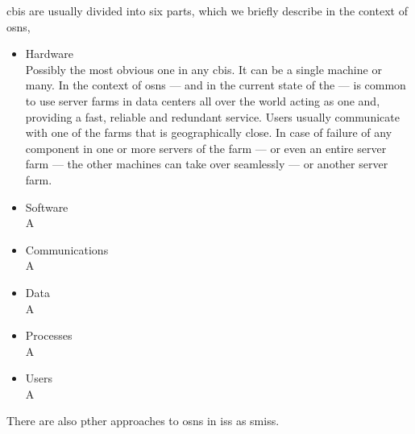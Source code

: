 \documentclass[showtrims,oldfontcommands]{kthesis}
\begin{document}
\Ac{cbis} are usually divided into six parts, which we briefly describe in the context 
of \acp{osn},
\begin{itemize}
    \item Hardware\\
    Possibly the most obvious one in any \ac{cbis}. It can be a single machine or 
    many. In the context of \acp{osn} --- and in the current state of the \Internet 
    --- is common to use server farms in data centers all over the world acting 
    as one and, providing a fast, reliable and redundant service. Users usually 
    communicate with one of the farms that is geographically close. In case of failure 
    of any component in one or more servers of the farm --- or even an entire server 
    farm --- the other machines can take over seamlessly --- or another server farm.
    
    \item Software\\
    A
    
    \item Communications\\
    A
    
    \item Data\\
    A
    
    \item Processes\\
    A
    
    \item Users\\
    A
    
\end{itemize}


There are also pther approaches to \acp{osn} in \acp{is} as \acp{smis}.


\end{document}
